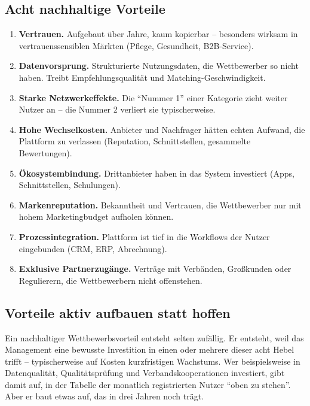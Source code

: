 \documentclass[11pt,a4paper,oneside]{article}
\newcommand{\fachbegriff}[1]{\textbf{#1}}
\begin{document}
\subsection{Acht nachhaltige Vorteile}

\begin{enumerate}
  \item \fachbegriff{Vertrauen.} Aufgebaut über Jahre, kaum kopierbar -- besonders wirksam in vertrauenssensiblen Märkten (Pflege, Gesundheit, B2B-Service).
  \item \fachbegriff{Datenvorsprung.} Strukturierte Nutzungsdaten, die Wettbewerber so nicht haben. Treibt Empfehlungsqualität und Matching-Geschwindigkeit.
  \item \fachbegriff{Starke Netzwerkeffekte.} Die ``Nummer 1'' einer Kategorie zieht weiter Nutzer an -- die Nummer 2 verliert sie typischerweise.
  \item \fachbegriff{Hohe Wechselkosten.} Anbieter und Nachfrager hätten echten Aufwand, die Plattform zu verlassen (Reputation, Schnittstellen, gesammelte Bewertungen).
  \item \fachbegriff{Ökosystembindung.} Drittanbieter haben in das System investiert (Apps, Schnittstellen, Schulungen).
  \item \fachbegriff{Markenreputation.} Bekanntheit und Vertrauen, die Wettbewerber nur mit hohem Marketingbudget aufholen können.
  \item \fachbegriff{Prozessintegration.} Plattform ist tief in die Workflows der Nutzer eingebunden (CRM, ERP, Abrechnung).
  \item \fachbegriff{Exklusive Partnerzugänge.} Verträge mit Verbänden, Großkunden oder Regulierern, die Wettbewerbern nicht offenstehen.
\end{enumerate}

\subsection{Vorteile aktiv aufbauen statt hoffen}

Ein nachhaltiger Wettbewerbsvorteil entsteht selten zufällig. Er entsteht, weil das Management eine bewusste Investition in einen oder mehrere dieser acht Hebel trifft -- typischerweise auf Kosten kurzfristigen Wachstums. Wer beispielsweise in Datenqualität, Qualitätsprüfung und Verbandskooperationen investiert, gibt damit auf, in der Tabelle der monatlich registrierten Nutzer ``oben zu stehen''. Aber er baut etwas auf, das in drei Jahren noch trägt.
\end{document}
